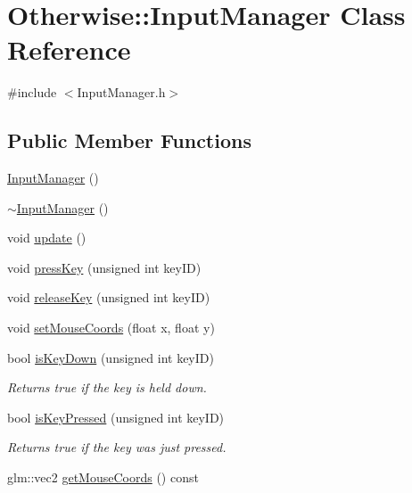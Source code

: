 \hypertarget{class_otherwise_1_1_input_manager}{}\section{Otherwise\+:\+:Input\+Manager Class Reference}
\label{class_otherwise_1_1_input_manager}


{\ttfamily \#include $<$Input\+Manager.\+h$>$}

\subsection*{Public Member Functions}
\begin{DoxyCompactItemize}
\item 
\hyperlink{class_otherwise_1_1_input_manager_aa1f22cbef02930281a9e78b0890d31dc}{Input\+Manager} ()
\item 
\hyperlink{class_otherwise_1_1_input_manager_ab1fac19da4955d26ba1d73e4b5e06bae}{$\sim$\+Input\+Manager} ()
\item 
void \hyperlink{class_otherwise_1_1_input_manager_a21b3233ea6ae253dd9a664b0c61ac6f3}{update} ()
\item 
void \hyperlink{class_otherwise_1_1_input_manager_a2de3502a6d1d80de801d884b7ccb1de2}{press\+Key} (unsigned int key\+ID)
\item 
void \hyperlink{class_otherwise_1_1_input_manager_a054c573ed26193304704769bc8ab618f}{release\+Key} (unsigned int key\+ID)
\item 
void \hyperlink{class_otherwise_1_1_input_manager_a2c48b5de9df66ad124fa14ae8f3aec1c}{set\+Mouse\+Coords} (float x, float y)
\item 
bool \hyperlink{class_otherwise_1_1_input_manager_a315000bf4db34cd497dd406338d272f3}{is\+Key\+Down} (unsigned int key\+ID)
\begin{DoxyCompactList}\small\item\em Returns true if the key is held down. \end{DoxyCompactList}\item 
bool \hyperlink{class_otherwise_1_1_input_manager_a7614f9b32ec12b0562715d3b92eafedd}{is\+Key\+Pressed} (unsigned int key\+ID)
\begin{DoxyCompactList}\small\item\em Returns true if the key was just pressed. \end{DoxyCompactList}\item 
glm\+::vec2 \hyperlink{class_otherwise_1_1_input_manager_ad8acd4f5eccccf2cbbd343dc6483bbe7}{get\+Mouse\+Coords} () const
\end{DoxyCompactItemize}
